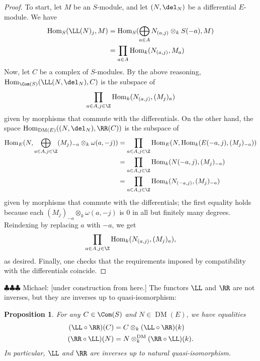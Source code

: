 \documentclass[12pt]{amsart}
\newtheorem{prop}[lemma]{Proposition}
\theoremstyle{definition}
\theoremstyle{remark}
\newcommand{\Hom}{\operatorname{Hom}} %
\newcommand{\michael}[1]{{\color{red} \sf $\clubsuit\clubsuit\clubsuit$ Michael: [#1]}}
\def\DM{\operatorname{DM}}
\def\o{\omega}
\begin{document}
\begin{proof}
To start, let $M$ be an $S$-module, and let $(N, \del_N)$ be a differential $E$-module. We have
\begin{align*}
\Hom_S( \LL(N)_j, M) &= \Hom_S(\bigoplus_{a \in A} N_{(a, j)} \otimes_k S(-a), M) \\
&=  \prod_{a \in A} \Hom_k ( N_{(a, j)} , M_a)\\
\end{align*}
Now, let $C$ be a complex of $S$-modules. By the above reasoning, $\Hom_{\Com(S)}( \LL(N, \del_N), C)$ is the subspace of 
$$
\prod_{a \in A, j \in \Z} \Hom_k ( N_{(a, j)} , (M_j)_{a})
$$
given by morphisms that commute with the differentials. On the other hand, the space $\Hom_{\DM(E)}((N, \del_N), \RR(C))$ is the subspace of 
\begin{align*}
\Hom_E(N, \bigoplus_{a \in A, j \in \Z} (M_j)_{-a} \otimes_k \o(a, -j)) &= \prod_{a \in A, j \in \Z}\Hom_E(N,  \Hom_k(E(-a, j), (M_j)_{-a}  ))  \\
&=   \prod_{a \in A, j \in \Z} \Hom_k(N(-a, j),  (M_j)_{-a} ) \\
&=  \prod_{a \in A, j \in \Z} \Hom_k(N_{(-a, j)},   (M_j)_{-a} )
\end{align*}
given by morphisms that commute with the differentials; the first equality holds because each $(M_j)_{-a} \otimes_k \o(a, -j)$ is 0 in all but finitely many degrees. Reindexing by replacing $a$ with $-a$, we get
$$
\prod_{a \in A, j \in \Z} \Hom_k(N_{(a, j)},   (M_j)_{a} ),
$$
as desired. Finally, one checks that the requirements imposed by compatibility with the differentials coincide.\end{proof}







\michael{under construction from here.}
The functors $\LL$ and $\RR$ are not inverses, but they are inverses up to quasi-isomorphism:

\begin{prop}
\label{resolutions}
For any $C \in \Com(S)$ and $N \in \DM(E)$, we have equalities
\begin{align*}
(\LL \circ \RR)(C) &= C \otimes_k (\LL \circ \RR)(k) \\
(\RR \circ \LL)(N) &= N \otimes^{\DM}_k (\RR \circ \LL)(k).
\end{align*}
In particular, $\LL$ and $\RR$ are inverses up to natural quasi-isomorphism. 
\end{prop}
\end{document}
